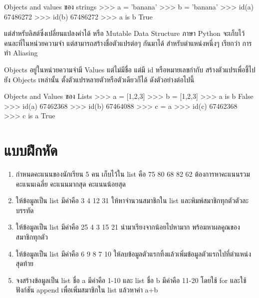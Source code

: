\begin{codelist}{Objects and values ของ strings}{}
>>> a = 'banana'
>>> b = 'banana'
>>> id(a)
67486272
>>> id(b)
67486272
>>> a is b
True
\end{codelist}


แต่สำหรับลิสต์ซึ่งเปลี่ยนแปลงค่าได้ หรือ Mutable Data Structure ภาษา Python จะเก็บไว้คนละที่ในหน่วยความจำ แต่สามารถสร้างชื่อตัวแปรต่อๆ กันมาได้ สำหรับตำแหน่งหนึ่งๆ เรียกว่า การทำ Aliasing

Objects อยู่ในหน่วยความจำมี Values แต่ไม่มีชื่อ แต่มี id หรือหมายเลขกำกับ สร้างตัวแปรเพื่อชี้ไปยัง Objects เหล่านั้น ตั้งตัวแปรหลายตัวหรือตัวเดียวก็ได้ ดังตัวอย่างต่อไปนี้

\begin{codelist}{Objects and Values ของ Lists}{}
>>> a = [1,2,3]
>>> b = [1,2,3]
>>> a is b
False
>>> id(a)
67462368
>>> id(b)
67464088
>>> c = a
>>> id(c)
67462368
>>> c is a
True
\end{codelist}


\section{แบบฝึกหัด}
\begin{enumerate} 
\item กำหนดคะแนนของนักเรียน 5 คน เก็บไว้ใน list คือ 75 80 68 82 62 ต้องการหาคะแนนรวม คะแนนเฉลี่ย คะแนนมากสุด คะแนนน้อยสุด 
\item ให้ข้อมูลเป็น list มีค่าคือ 3 4 12 31 ให้หาจำนวนสมาชิกใน list  และพิมพ์สมาชิกทุกตัวตัวละบรรทัด
\item ให้ข้อมูลเป็น list มีค่าคือ 25 4 3 15 21 นำมาเรียงจากน้อยไปหามาก พร้อมหาผลคูณของสมาชิกทุกตัว
\item ให้ข้อมูลเป็น list มีค่าคือ 6 9 8 7 10 ให้ลบข้อมูลตัวแรกทิ้งแล้วเพิ่มข้อมูลตัวแรกไปที่ตำแหน่งสุดท้าย
\item จงสร้างข้อมูลเป็น list ชื่อ a มีค่าคือ 1-10 และ list ชื่อ b มีค่าคือ 11-20 โดยใช้ for และใช้ฟังก์ชัน append เพื่อเพิ่มสมาชิกใน list แล้วหาค่า a+b
\end{enumerate}


